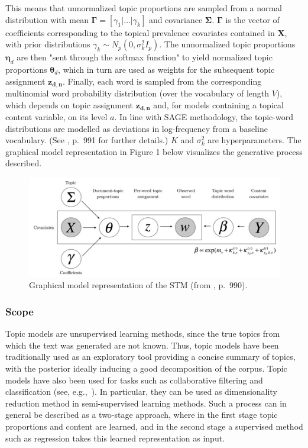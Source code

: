 \noindent
This means that unnormalized topic proportions are sampled from a normal distribution with mean $\boldsymbol{\Gamma} = [\gamma_1|\dots|\gamma_k]$ and covariance $\boldsymbol{\Sigma}$. $\boldsymbol{\Gamma}$ is the vector of coefficients corresponding to the topical prevalence covariates contained in $\boldsymbol{X}$, with prior distributions $\gamma_k \sim N_p(0, \sigma_k^2I_p)$. The unnormalized topic proportions $\boldsymbol{\eta}_d$ are then "sent through the softmax function" to yield normalized topic proportions $\boldsymbol{\theta}_d$, which in turn are used as weights for the subsequent topic assignment $\boldsymbol{z_{d,n}}$. Finally, each word is sampled from the corresponding multinomial word probability distribution (over the vocabulary of length $V$), which depends on topic assignment $\boldsymbol{z_{d,n}}$ and, for models containing a topical content variable, on its level $a$. In line with SAGE methodology, the topic-word distributions are modelled as deviations in log-frequency from a baseline vocabulary. (See \cite{roberts2016model}, p.\ 991 for further details.) $K$ and $\sigma_k^2$ are hyperparameters. The graphical model representation in Figure 1 below visualizes the generative process described.


\begin{figure}[h!]
  \centering
  \captionsetup{justification=centering,margin=2cm}
  \includegraphics[scale = 0.5]{../plots/2/stm_graphical.png}
  \caption{Graphical model representation of the STM (from \cite{roberts2016model}, p.\ 990).}
  \label{fig:graphical_model}
\end{figure}

\subsubsection*{Scope}

Topic models are unsupervised learning methods, since the true topics from which the text was generated are not known. Thus, topic models have been traditionally used as an exploratory tool providing a concise summary of topics, with the posterior ideally inducing a good decomposition of the corpus. Topic models have also been used for tasks such as collaborative filtering and classification (see, e.g.,\ \citealp{blei2003latent}). In particular, they can be used as dimensionality reduction method in semi-supervised learning methods. Such a process can in general be described as a two-stage approach, where in the first stage topic proportions and content are learned, and in the second stage a supervised method such as regression takes this learned representation as input. 

